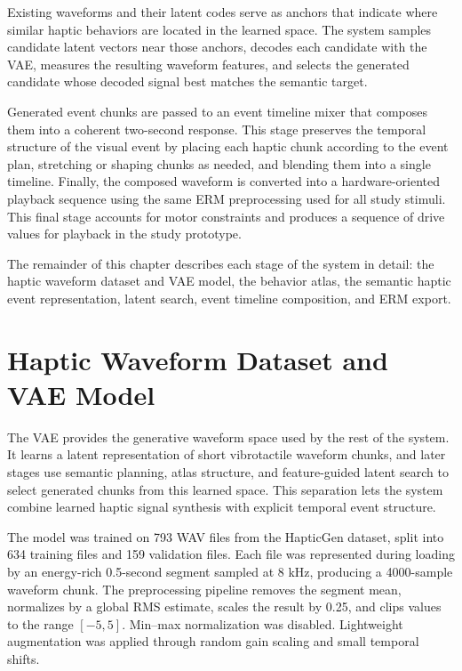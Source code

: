 Existing waveforms and their latent codes serve as anchors that indicate where similar haptic behaviors are located in the learned space. The system samples candidate latent vectors near those anchors, decodes each candidate with the VAE, measures the resulting waveform features, and selects the generated candidate whose decoded signal best matches the semantic target.

Generated event chunks are passed to an event timeline mixer that composes them into a coherent two-second response. This stage preserves the temporal structure of the visual event by placing each haptic chunk according to the event plan, stretching or shaping chunks as needed, and blending them into a single timeline. Finally, the composed waveform is converted into a hardware-oriented playback sequence using the same ERM preprocessing used for all study stimuli. This final stage accounts for motor constraints and produces a sequence of drive values for playback in the study prototype.

The remainder of this chapter describes each stage of the system in detail: the haptic waveform dataset and VAE model, the behavior atlas, the semantic haptic event representation, latent search, event timeline composition, and ERM export.

\section{Haptic Waveform Dataset and VAE Model}

The VAE provides the generative waveform space used by the rest of the system. It learns a latent representation of short vibrotactile waveform chunks, and later stages use semantic planning, atlas structure, and feature-guided latent search to select generated chunks from this learned space. This separation lets the system combine learned haptic signal synthesis with explicit temporal event structure.

The model was trained on 793 WAV files from the HapticGen dataset, split into 634 training files and 159 validation files. Each file was represented during loading by an energy-rich 0.5-second segment sampled at 8 kHz, producing a 4000-sample waveform chunk. The preprocessing pipeline removes the segment mean, normalizes by a global RMS estimate, scales the result by 0.25, and clips values to the range $[-5, 5]$. Min--max normalization was disabled. Lightweight augmentation was applied through random gain scaling and small temporal shifts.


